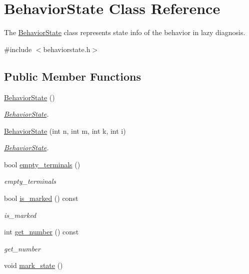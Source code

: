 \hypertarget{class_behavior_state}{}\section{Behavior\+State Class Reference}
\label{class_behavior_state}


The \hyperlink{class_behavior_state}{Behavior\+State} class represents state info of the behavior in lazy diagnosis.  




{\ttfamily \#include $<$behaviorstate.\+h$>$}

\subsection*{Public Member Functions}
\begin{DoxyCompactItemize}
\item 
\hyperlink{class_behavior_state_ae98eb22c5e7cf17f287177b96a737b03}{Behavior\+State} ()\hypertarget{class_behavior_state_ae98eb22c5e7cf17f287177b96a737b03}{}\label{class_behavior_state_ae98eb22c5e7cf17f287177b96a737b03}

\begin{DoxyCompactList}\small\item\em \hyperlink{class_behavior_state}{Behavior\+State}. \end{DoxyCompactList}\item 
\hyperlink{class_behavior_state_a3e13fbeed6b1db2a40b4b01fc879b623}{Behavior\+State} (int n, int m, int k, int i)
\begin{DoxyCompactList}\small\item\em \hyperlink{class_behavior_state}{Behavior\+State}. \end{DoxyCompactList}\item 
bool \hyperlink{class_behavior_state_ac110a160dab521de33f74168933797d5}{empty\+\_\+terminals} ()
\begin{DoxyCompactList}\small\item\em empty\+\_\+terminals \end{DoxyCompactList}\item 
bool \hyperlink{class_behavior_state_ae75691fc27d4d4ee98e67ecf483d144e}{is\+\_\+marked} () const 
\begin{DoxyCompactList}\small\item\em is\+\_\+marked \end{DoxyCompactList}\item 
int \hyperlink{class_behavior_state_a7229a844be3ebd72a985b39d7ff51150}{get\+\_\+number} () const 
\begin{DoxyCompactList}\small\item\em get\+\_\+number \end{DoxyCompactList}\item 
void \hyperlink{class_behavior_state_a8378fa26dc29e847fbadf2ff55ba2d7d}{mark\+\_\+state} ()\hypertarget{class_behavior_state_a8378fa26dc29e847fbadf2ff55ba2d7d}{}\label{class_behavior_state_a8378fa26dc29e847fbadf2ff55ba2d7d}


\end{DoxyCompactItemize}

